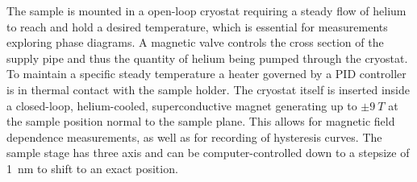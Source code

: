 The sample is mounted in a open-loop cryostat requiring a steady flow of helium to reach and hold a desired temperature, which is essential for measurements exploring phase diagrams.
A magnetic valve controls the cross section of the supply pipe and thus the quantity of helium being pumped through the cryostat.
To maintain a specific steady temperature a heater governed by a PID controller is in thermal contact with the sample holder.
The cryostat itself is inserted inside a closed-loop, helium-cooled, superconductive magnet generating up to $\pm\qty{9}{T}$ at the sample position normal to the sample plane.
This allows for magnetic field dependence measurements, as well as for recording of hysteresis curves.
The sample stage has three axis and can be computer-controlled down to a stepsize of \qty{1}{nm} to shift to an exact position.

